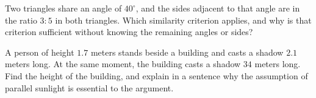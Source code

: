 \begin{exercise}
Two triangles share an angle of $40^\circ$, and the sides adjacent to that
angle are in the ratio $3:5$ in both triangles. Which similarity criterion
applies, and why is that criterion sufficient without knowing the remaining
angles or sides?
\end{exercise}

\begin{exercise}
A person of height $1.7$ meters stands beside a building and casts a shadow
$2.1$ meters long. At the same moment, the building casts a shadow $34$
meters long. Find the height of the building, and explain in a sentence why
the assumption of parallel sunlight is essential to the argument.
\end{exercise}
